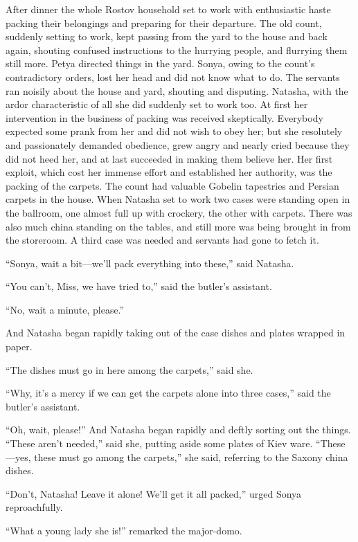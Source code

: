 After dinner the whole Rostov household set to work with
enthusiastic haste packing their belongings and preparing for
their departure. The old count, suddenly setting to work, kept
passing from the yard to the house and back again, shouting
confused instructions to the hurrying people, and flurrying them
still more. Petya directed things in the yard. Sonya, owing to
the count's contradictory orders, lost her head and did not know
what to do. The servants ran noisily about the house and yard,
shouting and disputing. Natasha, with the ardor characteristic of
all she did suddenly set to work too. At first her intervention
in the business of packing was received skeptically. Everybody
expected some prank from her and did not wish to obey her; but
she resolutely and passionately demanded obedience, grew angry
and nearly cried because they did not heed her, and at last
succeeded in making them believe her.  Her first exploit, which
cost her immense effort and established her authority, was the
packing of the carpets. The count had valuable Gobelin tapestries
and Persian carpets in the house. When Natasha set to work two
cases were standing open in the ballroom, one almost full up with
crockery, the other with carpets. There was also much china
standing on the tables, and still more was being brought in from
the storeroom. A third case was needed and servants had gone to
fetch it.

``Sonya, wait a bit---we'll pack everything into these,'' said
Natasha.

``You can't, Miss, we have tried to,'' said the butler's
assistant.

``No, wait a minute, please.''

And Natasha began rapidly taking out of the case dishes and
plates wrapped in paper.

``The dishes must go in here among the carpets,'' said she.

``Why, it's a mercy if we can get the carpets alone into three
cases,'' said the butler's assistant.

``Oh, wait, please!'' And Natasha began rapidly and deftly
sorting out the things. ``These aren't needed,'' said she,
putting aside some plates of Kiev ware. ``These---yes, these must
go among the carpets,'' she said, referring to the Saxony china
dishes.

``Don't, Natasha! Leave it alone! We'll get it all packed,''
urged Sonya reproachfully.

``What a young lady she is!'' remarked the major-domo.

